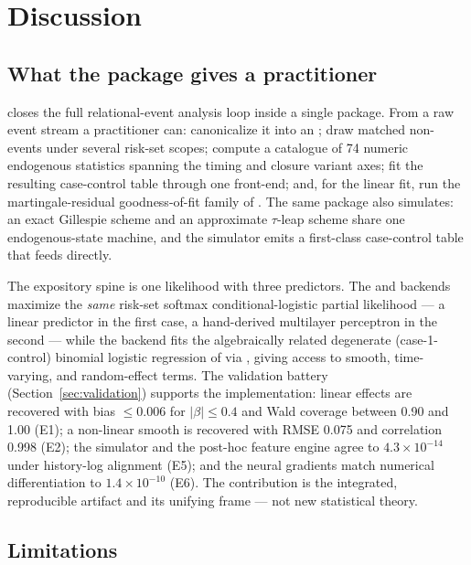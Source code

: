 \section{Discussion}
\label{sec:discussion}

\subsection{What the package gives a practitioner}
\label{sec:disc-summary}

 closes the full relational-event analysis loop inside a single
 package. From a raw event stream a practitioner can: canonicalize
it into an ; draw matched non-events under several risk-set
scopes; compute a catalogue of 74 numeric endogenous statistics spanning the
timing and closure variant axes; fit the resulting case-control table
through one  front-end; and, for the linear fit, run the
martingale-residual goodness-of-fit family of \citet{boschi2025gof}. The same
package also simulates: an exact Gillespie scheme and an approximate
$\tau$-leap scheme share one endogenous-state machine, and the simulator emits a
first-class case-control table that feeds  directly.

The expository spine is one likelihood with three predictors. The 
and  backends maximize the \emph{same} risk-set softmax
conditional-logistic partial likelihood --- a linear predictor in the first
case, a hand-derived multilayer perceptron in the second --- while the
 backend fits the algebraically related degenerate (case-1-control)
binomial logistic regression of \citet{boschi2025rhem} via , giving
access to smooth, time-varying, and random-effect terms. The validation battery
(Section~\ref{sec:validation}) supports the implementation: linear effects are
recovered with bias $\le 0.006$ for $|\beta| \le 0.4$ and Wald coverage between
0.90 and 1.00 (E1); a non-linear smooth is recovered with RMSE 0.075 and
correlation 0.998 (E2); the simulator and the post-hoc feature engine agree to
$4.3\times 10^{-14}$ under history-log alignment (E5); and the neural gradients
match numerical differentiation to $1.4\times 10^{-10}$ (E6). The contribution
is the integrated, reproducible artifact and its unifying frame --- not new
statistical theory.

\subsection{Limitations}
\label{sec:disc-limitations}

